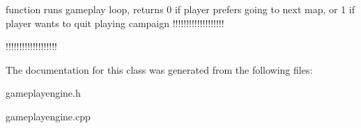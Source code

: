 function runs gameplay loop, returns 0 if player prefers going to next map, or 1 if player wants to quit playing campaign !!!!!!!!!!!!!!!!!!!

!!!!!!!!!!!!!!!!!!! 

The documentation for this class was generated from the following files\+:\begin{DoxyCompactItemize}
\item 
gameplayengine.\+h\item 
gameplayengine.\+cpp\end{DoxyCompactItemize}
